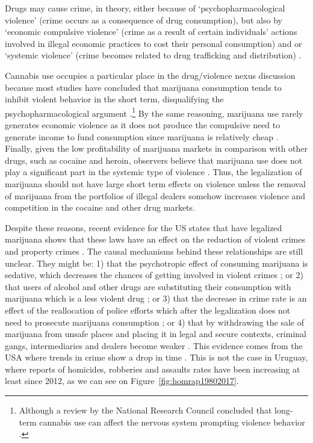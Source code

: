\documentclass[11pt]{article}
\begin{document}
Drugs may cause crime, in theory, either because of ‘psychopharmacological violence’ (crime occurs as a consequence of drug consumption), but also by ‘economic compulsive violence’ (crime as a result of certain individuals’ actions involved in illegal economic practices to cost their personal consumption) and or ‘systemic violence’ (crime becomes related to drug trafficking and distribution) \citep{goldstein1985drugs,adda2014crime}.

Cannabis use occupies a particular place in the drug/violence nexus discussion because most studies have concluded that marijuana consumption tends to inhibit violent behavior in the short term, disqualifying the psychopharmacological argument \citep{white2000dynamics}.\footnote{Although a review by the National Research Council concluded that long-term cannabis use can affect the nervous system prompting violence behavior \citep{national1994understanding}.} By the same reasoning, marijuana use rarely generates economic violence as it does not produce the compulsive need to generate income to fund consumption since marijuana is relatively cheap \citep{caulkins2016marijuana}. Finally, given the low profitability of marijuana markets in comparison with other drugs, such as cocaine and heroin, observers believe that marijuana use does not play a significant part in the systemic type of violence \citep{pacula2003marijuana, caulkins2015considering}. Thus, the legalization of marijuana should not have large short term effects on violence unless the removal of marijuana from the portfolios of illegal dealers somehow increases violence and competition in the cocaine and other drug markets.

Despite these reasons, recent evidence for the US states that have legalized marijuana shows that these laws have an effect on the reduction of violent crimes and property crimes \citep{dragone2019crime, Indigo:2016, gavrilova2014legal, huber2016cannabis,brinkman2019not, hao2017cross}. The causal mechanisms behind these relationships are still unclear. They might be: 1) that the psychotropic effect of consuming marijuana is sedative, which decreases the chances of getting involved in violent crimes \citep{no2001health, green2003being}; or 2) that users of alcohol and other drugs are substituting their consumption with marijuana which is a less violent drug \citep{anderson2014legalization, kelly2014policing} ; or 3) that the decrease in crime rate is an effect of the reallocation of police efforts which after the legalization does not need to prosecute marijuana consumption \citep{adda2014crime}; or 4) that by withdrawing the sale of marijuana from unsafe places and placing it in legal and secure contexts, criminal gangs, intermediaries and dealers become weaker \citep{becker2013have, becker1968crime}. This evidence comes from the USA where trends in crime show a drop in time \citep{gramlich5facts, james2018recent}. This is not the case in Uruguay, where reports of homicides, robberies and assaults rates have been increasing at least since 2012, as we can see on Figure~\ref{fig:homrap19802017}.
\end{document}
